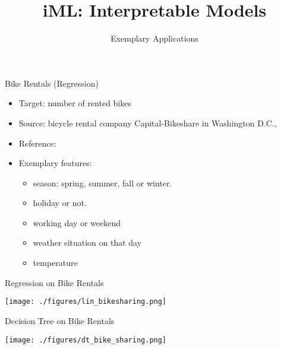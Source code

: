 \documentclass[aspectratio=169]{../latex_main/tntbeamer}  %
\title[Introduction]{iML: Interpretable Models}
\subtitle{Exemplary Applications}
\begin{document}
	
	\maketitle


    \begin{frame}{Bike Rentals (Regression)}
        
        \begin{itemize}
            \item Target: number of rented bikes
            \item Source: bicycle rental company Capital-Bikeshare in Washington D.C.,
            \item Reference: 
            \item Exemplary features:
            \begin{itemize}
                \item season: spring, summer, fall or winter.
                \item holiday or not.
                \item working day or weekend
                \item weather situation on that day 
                \item temperature
            \end{itemize}
        \end{itemize}
        
    \end{frame}
    
    \begin{frame}{Regression on Bike Rentals}
        
        \centering
        \texttt{[image: ./figures/lin\_bikesharing.png]}        

    \end{frame}
    
    \begin{frame}{Decision Tree on Bike Rentals}
        
        \centering
        \texttt{[image: ./figures/dt\_bike\_sharing.png]}        

    \end{frame}
    
\end{document}

